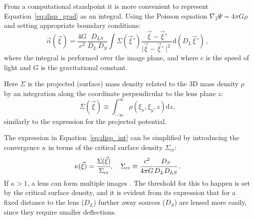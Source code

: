 From a computational standpoint it is more convenient to represent Equation~\eqref{eq:disp_grad} as an integral. Using the Poisson equation $\nabla_2 \Psi= 4\pi G\rho$ and setting appropriate boundary conditions:
\begin{equation} \label{eq:disp_int}
    \vec{\alpha}(\vec{\xi}) = \frac{4 G}{c^2} \frac{D_{LS}}{D_L \, D_S} \int \Sigma(\vec{\xi}') \frac{\vec{\xi} - \vec{\xi}'}{\mid\vec{\xi} - \vec{\xi}'\mid^2}   \mathrm{d}{(D_L \vec{\xi}')} \, ,
\end{equation}
where the integral is performed over the image plane, and where $c$ is the speed of light and $G$ is the gravitational constant.

Here $\Sigma$ is the projected (surface) mass density related to the 3D mass density $\rho$ by an integration along the coordinate perpendicular to the lens plane $z$:
\begin{equation}
	\Sigma(\vec\xi) \equiv \int_{-\infty}^{\infty} \rho({\xi}_x, {\xi}_y, z) \mathrm{d}{z},
\end{equation}
similarly to the expression for the projected potential.

The expression in Equation~\eqref{eq:disp_int} can be simplified by introducing the convergence $\kappa$ in terms of the critical surface density $\Sigma_{\mathrm{cr}}$:
\begin{equation}
    \kappa(\vec{\xi})=\cfrac{\Sigma(\vec{\xi})}{\Sigma_{\mathrm{cr}}},
    \quad \Sigma_{\mathrm{cr}}\equiv\cfrac{c^2}{4\pi G}\cfrac{D_S}{D_L D_{LS}} \, .
\end{equation}
If  $\kappa > 1$, a lens can form multiple images \cite[Section 2.6]{Meneghetti:2016aa}. The threshold for this to happen is set by the critical surface density, and it is evident from its expression that for a fixed distance to the lens ($D_L $) further away sources  ($D_S$) are lensed more easily, since they require smaller deflections.


